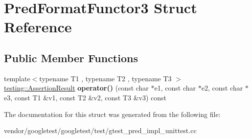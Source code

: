 \hypertarget{struct_pred_format_functor3}{}\section{Pred\+Format\+Functor3 Struct Reference}
\label{struct_pred_format_functor3}
\subsection*{Public Member Functions}
\begin{DoxyCompactItemize}
\item 
\mbox{\label{struct_pred_format_functor3_a35575b0ed1e572d3a31603b07a3f6b30}} 
{\footnotesize template$<$typename T1 , typename T2 , typename T3 $>$ }\\\hyperlink{classtesting_1_1_assertion_result}{testing\+::\+Assertion\+Result} {\bfseries operator()} (const char $\ast$e1, const char $\ast$e2, const char $\ast$e3, const T1 \&v1, const T2 \&v2, const T3 \&v3) const
\end{DoxyCompactItemize}


The documentation for this struct was generated from the following file\+:\begin{DoxyCompactItemize}
\item 
vendor/googletest/googletest/test/gtest\+\_\+pred\+\_\+impl\+\_\+unittest.\+cc\end{DoxyCompactItemize}
